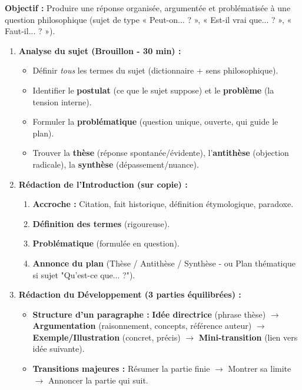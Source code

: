 \documentclass[11pt]{article}
\begin{document}
\begin{methode}
\textbf{Objectif :} Produire une réponse organisée, argumentée et problématisée à une question philosophique (sujet de type « Peut-on... ? », « Est-il vrai que... ? », « Faut-il... ? »).
\begin{enumerate}
    \item \textbf{Analyse du sujet (Brouillon - 30 min) :}
        \begin{itemize}
            \item Définir \emph{tous} les termes du sujet (dictionnaire + sens philosophique).
            \item Identifier le \textbf{postulat} (ce que le sujet suppose) et le \textbf{problème} (la tension interne).
            \item Formuler la \textbf{problématique} (question unique, ouverte, qui guide le plan).
            \item Trouver la \textbf{thèse} (réponse spontanée/évidente), l'\textbf{antithèse} (objection radicale), la \textbf{synthèse} (dépassement/nuance).
        \end{itemize}
    \item \textbf{Rédaction de l'Introduction (sur copie) :}
        \begin{enumerate}
            \item \textbf{Accroche :} Citation, fait historique, définition étymologique, paradoxe.
            \item \textbf{Définition des termes} (rigoureuse).
            \item \textbf{Problématique} (formulée en question).
            \item \textbf{Annonce du plan} (Thèse / Antithèse / Synthèse - ou Plan thématique si sujet "Qu'est-ce que... ?").
        \end{enumerate}
    \item \textbf{Rédaction du Développement (3 parties équilibrées) :}
        \begin{itemize}
            \item \textbf{Structure d'un paragraphe :} \textbf{Idée directrice} (phrase thèse) $\rightarrow$ \textbf{Argumentation} (raisonnement, concepts, référence auteur) $\rightarrow$ \textbf{Exemple/Illustration} (concret, précis) $\rightarrow$ \textbf{Mini-transition} (lien vers idée suivante).
            \item \textbf{Transitions majeures :} Résumer la partie finie $\rightarrow$ Montrer sa limite $\rightarrow$ Annoncer la partie qui suit.

\end{itemize}
\end{enumerate}
\end{methode}
\end{document}
